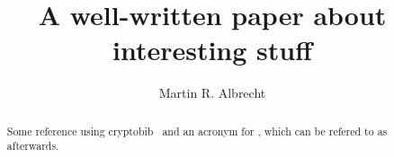 \documentclass[a4paper,10pt]{llncs}
\title{A well-written paper about interesting stuff}
\author{Martin R. Albrecht \inst{1}}
\institute{King's College London}
\begin{document}
\maketitle

\begin{abstract}
  Some reference using cryptobib~\cite{EC:AFLN24} and an acronym for \SIS, which can be refered to as \SIS afterwards.
\end{abstract}








\clearpage


\end{document}
